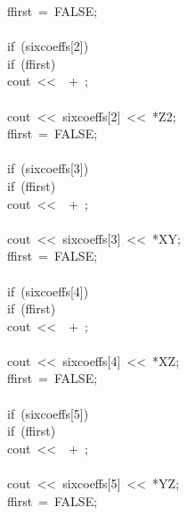\begin{tabbing}
\>\>\>ffirst\ =\ FALSE;\\[0pt]
\>\>\>\\[0pt]
\>\>if\ (sixcoeffs[2])\ \\[0pt]
\>\>\>if\ (ffirst)\ \\[0pt]
\>\>\>\>cout\ <<\ \ +\ ;\\[0pt]
\>\>\>\>\\[0pt]
\>\>\>cout\ <<\ sixcoeffs[2]\ <<\ *Z2;\\[0pt]
\>\>\>ffirst\ =\ FALSE;\\[0pt]
\>\>\>\\[0pt]
\>\>if\ (sixcoeffs[3])\ \\[0pt]
\>\>\>if\ (ffirst)\ \\[0pt]
\>\>\>\>cout\ <<\ \ +\ ;\\[0pt]
\>\>\>\>\\[0pt]
\>\>\>cout\ <<\ sixcoeffs[3]\ <<\ *XY;\\[0pt]
\>\>\>ffirst\ =\ FALSE;\\[0pt]
\>\>\>\\[0pt]
\>\>if\ (sixcoeffs[4])\ \\[0pt]
\>\>\>if\ (ffirst)\ \\[0pt]
\>\>\>\>cout\ <<\ \ +\ ;\\[0pt]
\>\>\>\>\\[0pt]
\>\>\>cout\ <<\ sixcoeffs[4]\ <<\ *XZ;\\[0pt]
\>\>\>ffirst\ =\ FALSE;\\[0pt]
\>\>\>\\[0pt]
\>\>if\ (sixcoeffs[5])\ \\[0pt]
\>\>\>if\ (ffirst)\ \\[0pt]
\>\>\>\>cout\ <<\ \ +\ ;\\[0pt]
\>\>\>\>\\[0pt]
\>\>\>cout\ <<\ sixcoeffs[5]\ <<\ *YZ;\\[0pt]
\>\>\>ffirst\ =\ FALSE;\\[0pt]
\>\>\>\\[0pt]

\end{tabbing}
